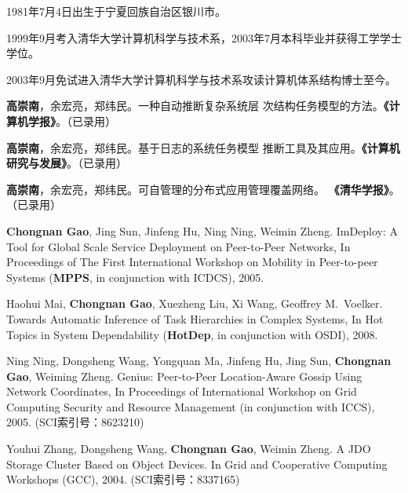 \begin{resume}


  1981年7月4日出生于宁夏回族自治区银川市。

  1999年9月考入清华大学计算机科学与技术系，2003年7月本科毕业并获得工学学士学位。

  2003年9月免试进入清华大学计算机科学与技术系攻读计算机体系结构博士至今。


  \begin{enumerate}[{[}1{]}]

  \item \textbf{高崇南}，余宏亮，郑纬民。一种自动推断复杂系统层
  次结构任务模型的方法。\textbf{《计算机学报》}。（已录用）

  \item \textbf{高崇南}，余宏亮，郑纬民。基于日志的系统任务模型
  推断工具及其应用。\textbf{《计算机研究与发展》}。（已录用）

  \item \textbf{高崇南}，余宏亮，郑纬民。可自管理的分布式应用管理覆盖网络。
  \textbf{《清华学报》}。（已录用）

  \item \textbf{Chongnan Gao}, Jing Sun, Jinfeng Hu, Ning Ning,
  Weimin Zheng.  ImDeploy: A Tool for Global Scale Service
  Deployment on Peer-to-Peer Networks, In Proceedings of The
  First International Workshop on Mobility in Peer-to-peer
  Systems (\textbf{MPPS}, in conjunction with ICDCS), 2005.

  \item Haohui Mai, \textbf{Chongnan Gao}, Xuezheng Liu, Xi
  Wang, Geoffrey M.\ Voelker. Towards Automatic Inference of
  Task Hierarchies in Complex Systems, In Hot Topics in System
  Dependability (\textbf{HotDep}, in conjunction with OSDI),
  2008.

  \item Ning Ning, Dongsheng Wang, Yongquan Ma, Jinfeng Hu, Jing Sun,
  \textbf{Chongnan Gao}, Weiming Zheng. Genius: Peer-to-Peer Location-Aware
  Gossip Using Network Coordinates, In Proceedings of International Workshop
  on Grid Computing Security and Resource Management (in conjunction with
  ICCS), 2005. (SCI索引号：8623210)

  \item Youhui Zhang, Dongsheng Wang, \textbf{Chongnan Gao}, Weimin Zheng. A
  JDO Storage Cluster Based on Object Devices. In Grid and Cooperative
  Computing Workshops (GCC), 2004. (SCI索引号：8337165)


\end{enumerate}
\end{resume}
